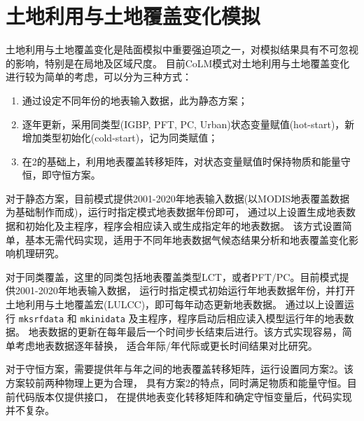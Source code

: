 \chapter{土地利用与土地覆盖变化模拟}\label{土地利用与土地覆盖变化模拟}

土地利用与土地覆盖变化是陆面模拟中重要强迫项之一，对模拟结果具有不可忽视的影响，特别是在局地及区域尺度。
目前CoLM模式对土地利用与土地覆盖变化进行较为简单的考虑，可以分为三种方式：
\begin{enumerate}
    \item 通过设定不同年份的地表输入数据，此为静态方案；
    \item 逐年更新，采用同类型(IGBP, PFT, PC, Urban)状态变量赋值(hot-start)，新增加类型初始化(cold-start)，记为同类赋值；
    \item 在2的基础上，利用地表覆盖转移矩阵，对状态变量赋值时保持物质和能量守恒，即守恒方案。
\end{enumerate}

对于静态方案，目前模式提供2001-2020年地表输入数据(以MODIS地表覆盖数据为基础制作而成)，运行时指定模式地表数据年份即可，
通过以上设置生成地表数据和初始化及主程序，程序会相应读入或生成指定年的地表数据。
该方式设置简单，基本无需代码实现，适用于不同年地表数据气候态结果分析和地表覆盖变化影响机理研究。

对于同类覆盖，这里的同类包括地表覆盖类型LCT，或者PFT/PC。目前模式提供2001-2020年地表输入数据，
运行时指定模式初始运行年地表数据年份，并打开土地利用与土地覆盖宏(LULCC)，即可每年动态更新地表数据。
通过以上设置运行 \texttt{mksrfdata} 和 \texttt{mkinidata} 及主程序，程序启动后相应读入模型运行年的地表数据。
地表数据的更新在每年最后一个时间步长结束后进行。该方式实现容易，简单考虑地表数据逐年替换，
适合年际/年代际或更长时间结果对比研究。

对于守恒方案，需要提供年与年之间的地表覆盖转移矩阵，运行设置同方案2。该方案较前两种物理上更为合理，
具有方案2的特点，同时满足物质和能量守恒。目前代码版本仅提供接口，
在提供地表变化转移矩阵和确定守恒变量后，代码实现并不复杂。
